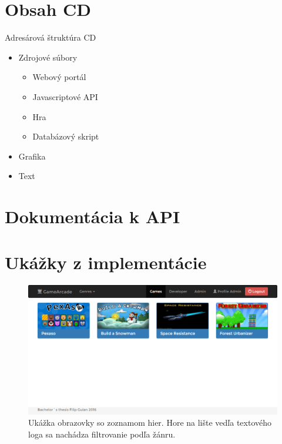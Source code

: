 \chapter{Obsah CD}
Adresárová štruktúra CD
\begin{itemize}
\item Zdrojové súbory
    \begin{itemize}
    \item Webový portál
    \item Javascriptové API
    \item Hra
    \item Databázový skript
    \end{itemize}
\item Grafika
\item Text
\end{itemize}

\chapter{Dokumentácia k API}

\chapter{Ukážky z implementácie}
\begin{figure}[h]
  \centering
  \includegraphics[scale=0.35]{fig/ukazka-zoznam-hier.png}
  \caption{Ukážka obrazovky so zoznamom hier. Hore na lište vedľa textového loga sa nachádza filtrovanie podľa žánru.}
  \label{fig:ukazka-zoznamhier}
\end{figure}

